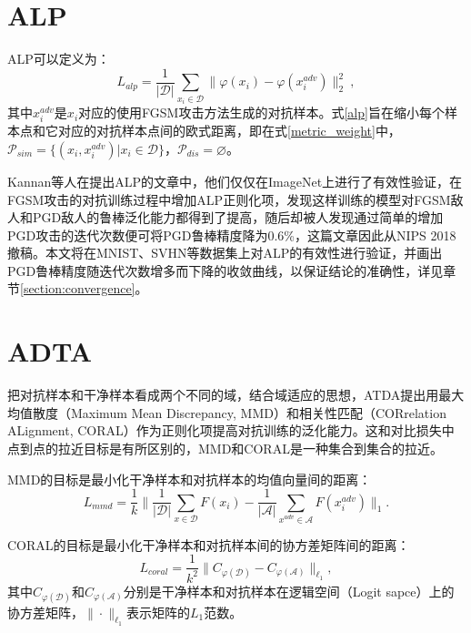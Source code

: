 \section{ALP} \label{section:alp}

ALP可以定义为：
\begin{equation}
    L_{alp}
    = 
    \frac{1}{|\mathcal{D}|} \sum_{x_i \in \mathcal{D}} \big\|\varphi(x_i) - \varphi(x_i^{adv})\big\|_2^2 \ ,
    \label{alp}
\end{equation}
其中$x_i^{adv}$是$x_i$对应的使用FGSM攻击方法生成的对抗样本。式\eqref{alp}旨在缩小每个样本点和它对应的对抗样本点间的欧式距离，即在式\eqref{metric_weight}中，$\mathcal{P}_{sim} = \{(x_i, x_i^{adv}) | x_i \in \mathcal{D} \}$，$\mathcal{P}_{dis} = \varnothing$。

Kannan等人在提出ALP的文章中，他们仅仅在ImageNet上进行了有效性验证，在FGSM攻击的对抗训练过程中增加ALP正则化项，发现这样训练的模型对FGSM敌人和PGD敌人的鲁棒泛化能力都得到了提高\cite{kannan2018adversarial}，随后却被人发现通过简单的增加PGD攻击的迭代次数便可将PGD鲁棒精度降为0.6\%\cite{engstrom2018evaluating}，这篇文章因此从NIPS 2018撤稿。本文将在MNIST、SVHN等数据集上对ALP的有效性进行验证，并画出PGD鲁棒精度随迭代次数增多而下降的收敛曲线，以保证结论的准确性，详见章节\ref{section:convergence}。

\section{ADTA}

把对抗样本和干净样本看成两个不同的域，结合域适应的思想，ATDA提出用最大均值散度（Maximum Mean Discrepancy, MMD）\cite{borgwardt2006integrating}和相关性匹配（CORrelation ALignment, CORAL）\cite{sun2016deep}作为正则化项提高对抗训练的泛化能力\cite{song2018improving}。这和对比损失中点到点的拉近目标是有所区别的，MMD和CORAL是一种集合到集合的拉近。

MMD的目标是最小化干净样本和对抗样本的均值向量间的距离：
\begin{equation}
    L_{mmd} 
    = 
    \frac{1}{k} \Big\| \frac{1}{|\mathcal{D}|} \sum_{x\in\mathcal{D}}F(x_i) - \frac{1}{|\mathcal{A}|} \sum_{x^{adv}\in\mathcal{A}}F(x_i^{adv}) \Big\|_1 
    .
\end{equation}

CORAL的目标是最小化干净样本和对抗样本间的协方差矩阵间的距离：
\begin{equation}
    L_{coral} 
    = 
    \frac{1}{k^2} \Big\| C_{\varphi(\mathcal{D})} -  C_{\varphi(\mathcal{A})} \Big\|_{\ell_1} 
    ,
\end{equation}
其中$C_{\varphi(\mathcal{D})}$和$C_{\varphi(\mathcal{A})}$分别是干净样本和对抗样本在逻辑空间（Logit sapce）上的协方差矩阵，$\| \cdot \|_{\ell_1}$表示矩阵的$L_1$范数。

